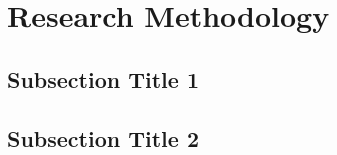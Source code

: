 \section{Research Methodology}\label{sec:method}
\subsection{Subsection Title 1}
\subsection{Subsection Title 2}



